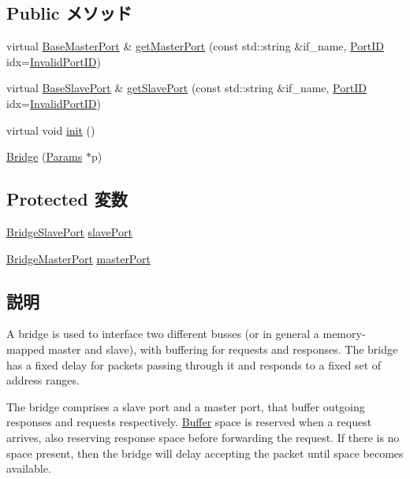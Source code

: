 \subsection*{Public メソッド}
\begin{DoxyCompactItemize}
\item 
virtual \hyperlink{classBaseMasterPort}{BaseMasterPort} \& \hyperlink{classBridge_adc4e675e51defbdd1e354dac729d0703}{getMasterPort} (const std::string \&if\_\-name, \hyperlink{base_2types_8hh_acef4d7d41cb21fdc252e20c04cd7bb8e}{PortID} idx=\hyperlink{base_2types_8hh_a65bf40f138cf863f0c5e2d8ca1144126}{InvalidPortID})
\item 
virtual \hyperlink{classBaseSlavePort}{BaseSlavePort} \& \hyperlink{classBridge_ac918a145092d7514ebc6dbd952dceafb}{getSlavePort} (const std::string \&if\_\-name, \hyperlink{base_2types_8hh_acef4d7d41cb21fdc252e20c04cd7bb8e}{PortID} idx=\hyperlink{base_2types_8hh_a65bf40f138cf863f0c5e2d8ca1144126}{InvalidPortID})
\item 
virtual void \hyperlink{classBridge_a02fd73d861ef2e4aabb38c0c9ff82947}{init} ()
\item 
\hyperlink{classBridge_a4fa35e032793298488841f07943d549f}{Bridge} (\hyperlink{classBridge_aff1c1420f91a1e81dfd9dc93d1fd470f}{Params} $\ast$p)
\end{DoxyCompactItemize}
\subsection*{Protected 変数}
\begin{DoxyCompactItemize}
\item 
\hyperlink{classBridge_1_1BridgeSlavePort}{BridgeSlavePort} \hyperlink{classBridge_a6cd5ac4c156de16d290c21f566968ac4}{slavePort}
\item 
\hyperlink{classBridge_1_1BridgeMasterPort}{BridgeMasterPort} \hyperlink{classBridge_a4ab26988f47c3d65c5f1b16488742580}{masterPort}
\end{DoxyCompactItemize}


\subsection{説明}
A bridge is used to interface two different busses (or in general a memory-\/mapped master and slave), with buffering for requests and responses. The bridge has a fixed delay for packets passing through it and responds to a fixed set of address ranges.

The bridge comprises a slave port and a master port, that buffer outgoing responses and requests respectively. \hyperlink{classBuffer}{Buffer} space is reserved when a request arrives, also reserving response space before forwarding the request. If there is no space present, then the bridge will delay accepting the packet until space becomes available. 

